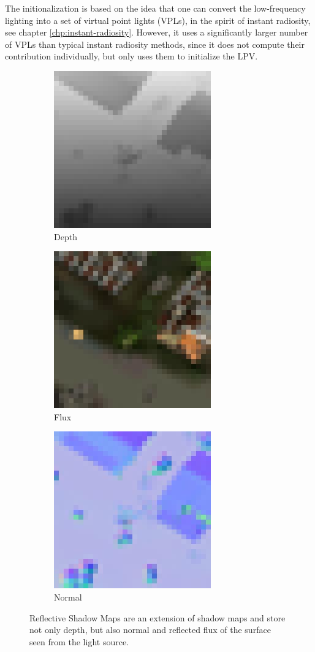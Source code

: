 The initionalization is based on the idea that one can convert the low-frequency lighting into a set of virtual point lights (VPLs), in the spirit of instant radiosity\cite{a:InstantRadiosity}, see chapter \ref{chp:instant-radiosity}. However, it uses a significantly larger number of VPLs than typical instant radiosity methods, since it does not compute their contribution individually, but only uses them to initialize the LPV.

\begin{figure}\label{f:lpv-rsm}
\begin{subfigure}[b]{0.32\textwidth}
	\includegraphics{graphics/lpv/lpv-3-1}
	\caption{Depth}
\end{subfigure}
\begin{subfigure}[b]{0.32\textwidth}
	\includegraphics{graphics/lpv/lpv-3-2}
	\caption{Flux}
\end{subfigure}
\begin{subfigure}[b]{0.32\textwidth}
	\includegraphics{graphics/lpv/lpv-3-3}
	\caption{Normal}
\end{subfigure}
\caption{Reflective Shadow Maps are an extension of shadow maps and store not only depth, but also normal and reflected flux of the surface seen from the light source.}
\end{figure}

